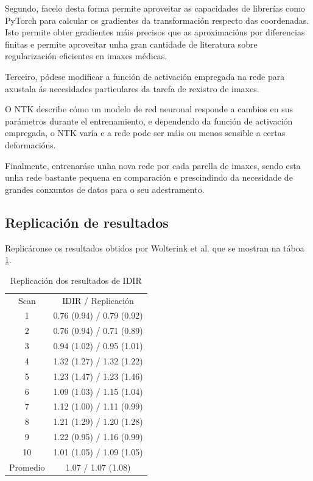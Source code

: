 Segundo, facelo desta forma permite aproveitar as capacidades de librerías como PyTorch para calcular os gradientes da transformación respecto das coordenadas.
Isto permite obter gradientes máis precisos que as aproximacións por diferencias finitas 
e permite aproveitar unha gran cantidade de literatura sobre regularización eficientes en imaxes médicas.

Terceiro, pódese modificar a función de activación empregada na rede para axustala ás necesidades particulares da tarefa de rexistro de imaxes.

O \gls{NTK} describe cómo un modelo de red neuronal responde a cambios en sus parámetros durante el entrenamiento,
e dependendo da función de activación empregada, o NTK varía e a rede pode ser máis ou menos sensible a certas deformacións.

Finalmente, entrenaráse unha nova rede por cada parella de imaxes, sendo esta unha rede bastante pequena en comparación e prescindindo da necesidade de grandes conxuntos de datos para o seu adestramento.

\subsection{Replicación de resultados}
\label{subsec:Replicación de resultados}

Replicáronse os resultados obtidos por Wolterink et al. \cite{wolterink2021implicit} que se mostran na táboa \ref{tab:comparison}.

\begin{table}[ht]
    \centering
    \caption{Replicación dos resultados de IDIR}
    \begin{tabular}{c|c}
        Scan & {IDIR / Replicación} \\
        1  & 0.76 (0.94) / 0.79 (0.92) \\
        2  & 0.76 (0.94) / 0.71 (0.89) \\
        3  & 0.94 (1.02) / 0.95 (1.01) \\
        4  & 1.32 (1.27) / 1.32 (1.22) \\
        5  & 1.23 (1.47) / 1.23 (1.46) \\
        6  & 1.09 (1.03) / 1.15 (1.04) \\
        7  & 1.12 (1.00) / 1.11 (0.99) \\
        8  & 1.21 (1.29) / 1.20 (1.28) \\
        9  & 1.22 (0.95) / 1.16 (0.99) \\
        10 & 1.01 (1.05) / 1.09 (1.05) \\
        Promedio & 1.07 / 1.07 (1.08) \\
    \end{tabular}
    \label{tab:comparison}
\end{table}

